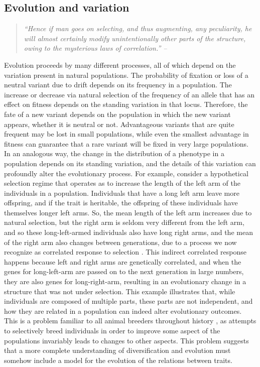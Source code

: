 \begin{refsection}

\section{Evolution and variation}\label{evolution-and-variation}

\begin{quote}
\textit{``Hence if man goes on selecting, and thus augmenting, any peculiarity,
he will almost certainly modify unintentionally other parts of the
structure, owing to the mysterious laws of correlation.'' --
\textbf{\textcite{Darwin1872}}}
\end{quote}

Evolution proceeds by many different processes, all of which depend on
the variation present in natural populations. The probability of
fixation or loss of a neutral variant due to drift depends on its
frequency in a population. The increase or decrease via natural
selection of the frequency of an allele that has an effect on fitness
depends on the standing variation in that locus. Therefore, the fate of
a new variant depends on the population in which the new variant
appears, whether it is neutral or not. Advantageous variants that are
quite frequent may be lost in small populations, while even the smallest
advantage in fitness can guarantee that a rare variant will be fixed in
very large populations. In an analogous way, the change in the
distribution of a phenotype in a population depends on its standing
variation, and the details of this variation can profoundly alter the
evolutionary process. For example, consider a hypothetical selection
regime that operates as to increase the length of the left arm of the
individuals in a population. Individuals that have a long left arm leave
more offspring, and if the trait is heritable, the offspring of these
individuals have themselves longer left arms. So, the mean length of the
left arm increases due to natural selection, but the right arm is seldom
very different from the left arm, and so these long-left-armed
individuals also have long right arms, and the mean of the right arm
also changes between generations, due to a process we now recognize as
correlated response to selection \parencite{Lande1983-ez}. This indirect
correlated response happens because left and right arms are genetically
correlated, and when the genes for long-left-arm are passed on to the
next generation in large numbers, they are also genes for
long-right-arm, resulting in an evolutionary change in a structure that
was not under selection. This example illustrates that, while
individuals are composed of multiple parts, these parts are not
independent, and how they are related in a population can indeed alter
evolutionary outcomes. This is a problem familiar to all animal breeders
throughout history \parencite{Hazel1943-uq}, as attempts to selectively breed
individuals in order to improve some aspect of the populations
invariably leads to changes to other aspects. This problem suggests that
a more complete understanding of diversification and evolution must
somehow include a model for the evolution of the relations between
traits.


\end{refsection}
